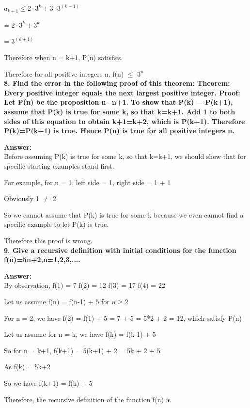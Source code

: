 \documentclass{article}
\begin{document}
\begin{large}
$a_{k+1} \le 2 \cdot 3^k + 3 \cdot 3^(k-1)$

 \indent\indent                    =  $2 \cdot 3^k + 3^k$
                     
 \indent\indent                    =  $3^(k+1)$

Therefore when n = k+1, P(n) satisfies.

Therefore for all positive integers n, f(n) $\le$ $3^n$\\

\textbf{8. Find the error in the following proof of this theorem:
Theorem: Every positive integer equals the next largest positive integer.
Proof: Let P(n) be the proposition n=n+1. To show that P(k) = P(k+1), assume that P(k) is true for some k, so that k=k+1. Add 1 to both sides of this equation to obtain k+1=k+2, which is P(k+1). Therefore P(k)=P(k+1) is true. Hence P(n) is true for all positive integers n.}

\textbf{Answer:}\\

Before assuming P(k) is true for some k, so that k=k+1, we should show that for specific starting examples stand first.

For example, for n = 1, left side = 1, right side = 1 + 1

Obviously 1 $\neq$ 2

So we cannot assume that P(k) is true for some k because we even cannot find a specific example to let P(k) is true.

Therefore this proof is wrong.\\

\textbf{9. Give a recursive definition with initial conditions for the function f(n)=5n+2,n=1,2,3,....}

\textbf{Answer:}\\


By observation, 
f(1) = 7
f(2) = 12
f(3) = 17
f(4) = 22

Let us assume f(n) = f(n-1) + 5 for $n \ge 2$

For n = 2, we have f(2) = f(1) + 5 = 7 + 5 = 5*2 + 2 = 12, which satisfy P(n)

Let us assume for n = k, we have f(k) = f(k-1) + 5

So for n = k+1, f(k+1) = 5(k+1) + 2 = 5k + 2 + 5

As f(k) = 5k+2

So we have f(k+1) = f(k) + 5

Therefore, the recursive definition of the function f(n) is


\end{large}
\end{document}
